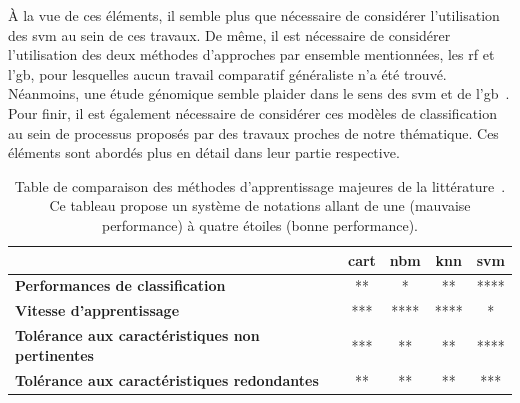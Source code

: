 À la vue de ces éléments, il semble plus que nécessaire de considérer l'utilisation des \gls{svm} au sein de ces travaux. De même, il est nécessaire de considérer l'utilisation des deux méthodes d'approches par ensemble mentionnées, les \gls{rf} et l'\gls{gb}, pour lesquelles aucun travail comparatif généraliste n'a été trouvé. Néanmoins, une étude génomique semble plaider dans le sens des \gls{svm} et de l'\gls{gb}~\cite{Ogutu2011}. Pour finir, il est également nécessaire de considérer ces modèles de classification au sein de processus proposés par des travaux proches de notre thématique. Ces éléments sont abordés plus en détail dans leur partie respective.\par

\begin{table}[H]
  \small
  \centering 
    \begin{tabular}{lcccc}
        \toprule
                                                                    & \textbf{\gls{cart}}   & \textbf{\gls{nbm}}& \textbf{\gls{knn}}    & \textbf{\gls{svm}}\\
        \midrule
        \textbf{Performances de classification}                     & **                    & *                 & **                    & ****              \\
        \midrule
        \textbf{Vitesse d'apprentissage}                            & ***                   & ****              & ****                  & *                 \\
        \midrule
        \textbf{Tolérance aux caractéristiques non pertinentes}     & ***                   & **                & **                    & ****              \\
        \midrule
        \textbf{Tolérance aux caractéristiques redondantes}         & **                    & **                & **                    & ***               \\
        \bottomrule
  \end{tabular}
  \caption{Table de comparaison des méthodes d'apprentissage majeures de la littérature~\cite{Kotsiantis2007}. Ce tableau propose un système de notations allant de une (mauvaise performance) à quatre étoiles (bonne performance).}
  \label{tab:model_comparison}
\end{table}
\clearpage


